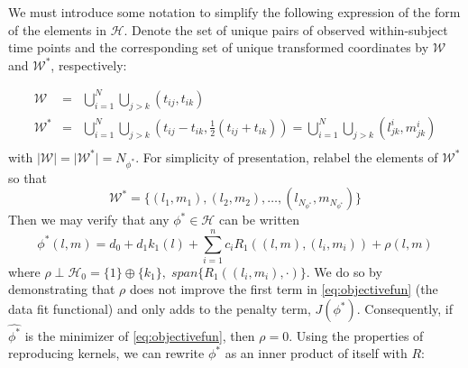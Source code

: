 \documentclass[12pt]{article}
\theoremstyle{definition}
\begin{document}
We must introduce some notation to simplify the following expression of the form of the elements in $\mathcal{H}$. Denote the set of unique pairs of observed within-subject time points and the corresponding set of unique transformed coordinates by $\mathcal{W}$ and $\mathcal{W}^*$, respectively:

\begin{eqnarray*}
\mathcal{W} &=& \bigcup_{i=1}^N \bigcup_{j>k}\left(t_{ij} ,t_{ik} \right)\\
\mathcal{W}^* &=& \bigcup_{i=1}^N \bigcup_{j>k}\left(t_{ij}-t_{ik} ,\frac{1}{2}\left( t_{ij}+t_{ik} \right) \right) = \bigcup_{i=1}^N \bigcup_{j>k}\left(l^i_{jk},m^i_{jk} \right)\\
\end{eqnarray*}
\noindent
with $\vert \mathcal{W}\vert = \vert \mathcal{W}^* \vert = N_{\phi^*}$. For simplicity of presentation, relabel the elements of $\mathcal{W}^*$ so that 
\[
\mathcal{W}^* = \lbrace \left( l_1,m_1 \right), \left( l_2,m_2 \right), \dots, \left( l_{N_{\phi^*}},m_{N_{\phi^*}} \right)  \rbrace
\]
\noindent
Then we may verify that any $\phi^* \in \mathcal{H}$ can be written 
\[
\phi^*\left(l,m \right) = d_0 + d_1k_1\left(l\right) + \sum_{i=1}^n  c_i R_1\left( \left(l,m\right) , \left(l_i,m_i \right)\right) + \rho\left(l,m\right)
\]
\noindent
where $\rho \perp \mathcal{H}_0 = \lbrace 1\rbrace \oplus \lbrace k_1\rbrace,\; span\lbrace R_1\left(\left(l_i, m_i \right),\cdot \right)  \rbrace$. We do so by demonstrating that  $\rho$ does not improve the first term in \eqref{eq:objectivefun} (the data fit functional) and only adds to the penalty term, $J\left(\phi^*\right)$. Consequently, if $\hat{\phi^*}$ is the minimizer of \eqref{eq:objectivefun}, then $\rho = 0$. Using the properties of reproducing kernels, we can rewrite $\phi^*$ as an inner product of itself with $R$:
 
\end{document}
